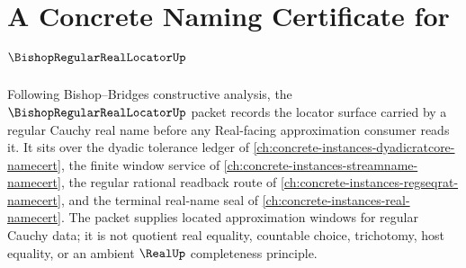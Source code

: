 \chapter{A Concrete Naming Certificate for $\BishopRegularRealLocatorUp$}
\label{ch:concrete-instances-bishop-regular-real-locator-namecert}

Following Bishop--Bridges constructive analysis, the $\BishopRegularRealLocatorUp$ packet records the locator surface carried by a regular Cauchy real name before any Real-facing approximation consumer reads it. It sits over the dyadic tolerance ledger of \autoref{ch:concrete-instances-dyadicratcore-namecert}, the finite window service of \autoref{ch:concrete-instances-streamname-namecert}, the regular rational readback route of \autoref{ch:concrete-instances-regseqrat-namecert}, and the terminal real-name seal of \autoref{ch:concrete-instances-real-namecert}. The packet supplies located approximation windows for regular Cauchy data; it is not quotient real equality, countable choice, trichotomy, host equality, or an ambient $\RealUp$ completeness principle.

